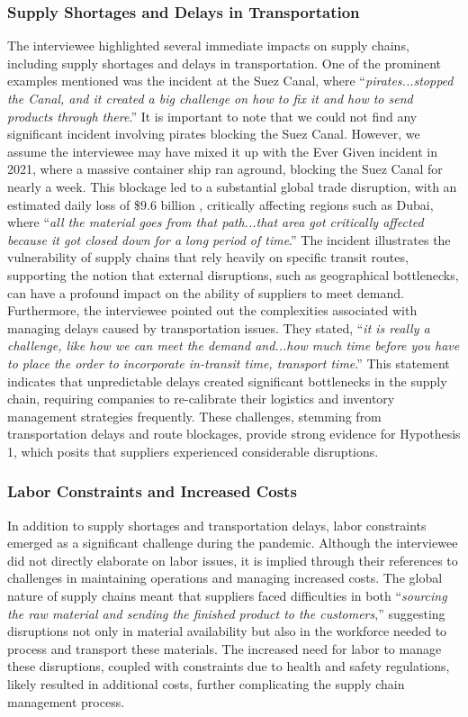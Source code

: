 \subsubsection{Supply Shortages and Delays in Transportation}

The interviewee highlighted several immediate impacts on supply chains, including supply shortages and delays in transportation. One of the prominent examples mentioned was the incident at the Suez Canal, where “\textit{pirates...stopped the Canal, and it created a big challenge on how to fix it and how to send products through there}.” It is important to note that we could not find any significant incident involving pirates blocking the Suez Canal. However, we assume the interviewee may have mixed it up with the Ever Given incident in 2021, where a massive container ship ran aground, blocking the Suez Canal for nearly a week. This blockage led to a substantial global trade disruption, with an estimated daily loss of \$9.6 billion \parencite{Harper2021SuezDay}, critically affecting regions such as Dubai, where “\textit{all the material goes from that path...that area got critically affected because it got closed down for a long period of time}.” The incident illustrates the vulnerability of supply chains that rely heavily on specific transit routes, supporting the notion that external disruptions, such as geographical bottlenecks, can have a profound impact on the ability of suppliers to meet demand. Furthermore, the interviewee pointed out the complexities associated with managing delays caused by transportation issues. They stated, “\textit{it is really a challenge, like how we can meet the demand and...how much time before you have to place the order to incorporate in-transit time, transport time}.” This statement indicates that unpredictable delays created significant bottlenecks in the supply chain, requiring companies to re-calibrate their logistics and inventory management strategies frequently. These challenges, stemming from transportation delays and route blockages, provide strong evidence for Hypothesis 1, which posits that suppliers experienced considerable disruptions.

\subsubsection{Labor Constraints and Increased Costs}

In addition to supply shortages and transportation delays, labor constraints emerged as a significant challenge during the pandemic. Although the interviewee did not directly elaborate on labor issues, it is implied through their references to challenges in maintaining operations and managing increased costs. The global nature of supply chains meant that suppliers faced difficulties in both “\textit{sourcing the raw material and sending the finished product to the customers},” suggesting disruptions not only in material availability but also in the workforce needed to process and transport these materials. The increased need for labor to manage these disruptions, coupled with constraints due to health and safety regulations, likely resulted in additional costs, further complicating the supply chain management process.

